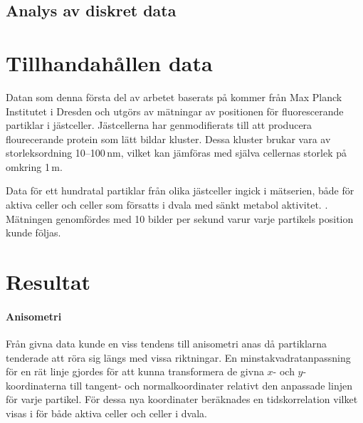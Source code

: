   

\subsection{Analys av diskret data}


\section{Tillhandahållen data}
Datan som denna första del av arbetet baserats på kommer från Max
Planck Institutet i Dresden och utgörs av mätningar av positionen för
fluorescerande partiklar i jästceller. Jästcellerna har genmodifierats till att producera flourecerande protein som lätt bildar
kluster. 
Dessa kluster brukar vara av storleksordning 10--100\,nm,
vilket kan jämföras med själva cellernas storlek på omkring
1\,\micro{}m.

Data för ett hundratal partiklar från olika jästceller ingick i mätserien, både för aktiva celler och celler som försatts i dvala med sänkt metabol aktivitet. . Mätningen genomfördes med 10 bilder per sekund varur varje partikels position kunde följas.


\section{Resultat}

\paragraph{Anisometri} Från givna data kunde en viss tendens till anisometri anas då partiklarna tenderade att röra sig längs med vissa riktningar. En minstakvadratanpassning för en rät linje gjordes för att kunna transformera de givna $x$- och $y$-koordinaterna till tangent- och normalkoordinater relativt den anpassade linjen för varje partikel. För dessa nya koordinater beräknades en tidskorrelation vilket visas i  för både aktiva celler och celler i dvala.

